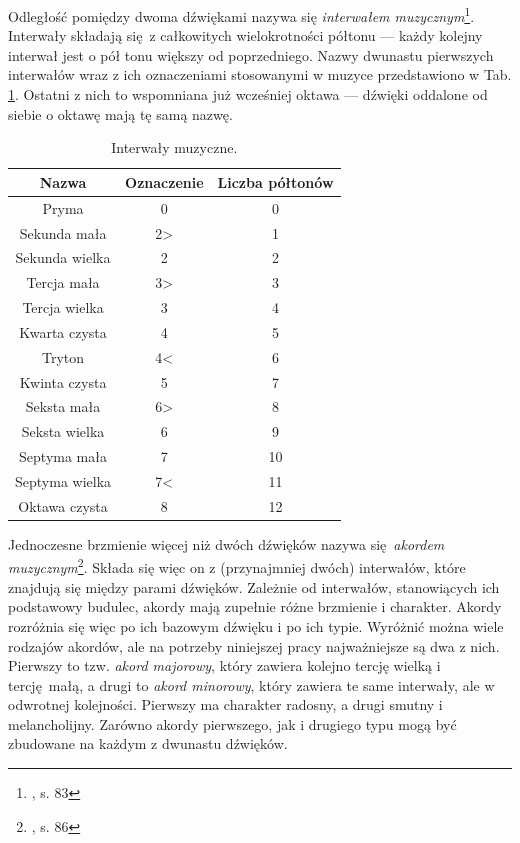 Odległość pomiędzy dwoma dźwiękami nazywa się \emph{interwałem muzycznym}\footnote{\cite{lerch_introduction_2012}, s.  83}. Interwały składają się z całkowitych wielokrotności półtonu --- każdy kolejny interwał jest o pół tonu większy od poprzedniego. Nazwy dwunastu pierwszych interwałów wraz z ich oznaczeniami stosowanymi w muzyce przedstawiono w Tab. \ref{tab:interwaly}. Ostatni z nich to wspomniana już wcześniej oktawa --- dźwięki oddalone od siebie o oktawę mają tę samą nazwę. 

\begin{table}[htb]
    \centering
    \caption{Interwały muzyczne.}
    \label{tab:interwaly}
    \begin{tabular}{|c|c|c|} \hline
        Nazwa & Oznaczenie & Liczba półtonów \\ \hline
        Pryma           & 0     & 0  \\
        Sekunda mała    & 2>    & 1  \\
        Sekunda wielka  & 2     & 2  \\
        Tercja mała     & 3>    & 3  \\
        Tercja wielka   & 3     & 4  \\
        Kwarta czysta   & 4     & 5  \\
        Tryton          & 4<    & 6  \\
        Kwinta czysta   & 5     & 7  \\
        Seksta mała     & 6>    & 8  \\
        Seksta wielka   & 6     & 9  \\
        Septyma mała    & 7     & 10 \\
        Septyma wielka  & 7<    & 11 \\
        Oktawa czysta   & 8     & 12 \\ \hline
    \end{tabular}
\end{table}

Jednoczesne brzmienie więcej niż dwóch dźwięków nazywa się \emph{akordem muzycznym}\footnote{\cite{lerch_introduction_2012}, s. 86}. Składa się więc on z (przynajmniej dwóch) interwałów, które znajdują się między parami dźwięków. Zależnie od interwałów, stanowiących ich podstawowy budulec, akordy mają zupełnie różne brzmienie i charakter. Akordy rozróżnia się więc po ich bazowym dźwięku i po ich typie. Wyróżnić można wiele rodzajów akordów, ale na potrzeby niniejszej pracy najważniejsze są dwa z nich.  Pierwszy to tzw. \emph{akord majorowy}, który zawiera kolejno tercję wielką i tercję małą, a drugi to \emph{akord minorowy}, który zawiera te same interwały, ale w odwrotnej kolejności. Pierwszy ma charakter radosny, a drugi smutny i melancholijny. Zarówno akordy pierwszego, jak i drugiego typu mogą być zbudowane na każdym z dwunastu dźwięków. 

